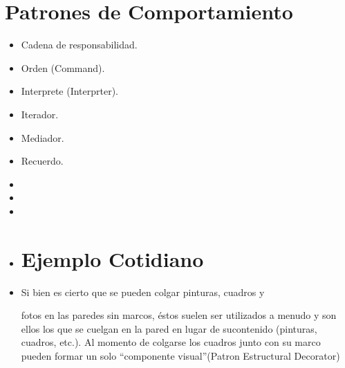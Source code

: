 \documentclass[10pt]{article}
\begin{document}
\newpage

\section{Patrones de Comportamiento}
\begin{itemize}
\item Cadena de responsabilidad. 
\item Orden (Command).
\item Interprete (Interprter).
\item Iterador.
\item Mediador.
\item Recuerdo.
\item
\item
\item
\item


\section{Ejemplo Cotidiano}
\item Si bien es cierto que se pueden colgar pinturas, cuadros y

 fotos en las paredes sin marcos, éstos suelen ser utilizados a
  menudo y son ellos los que se cuelgan en la pared en lugar de sucontenido (pinturas, cuadros, etc.). Al momento de colgarse los
 cuadros junto con su marco pueden formar un solo “componente visual”(Patron Estructural Decorator)
\end{itemize}
\end{document}
